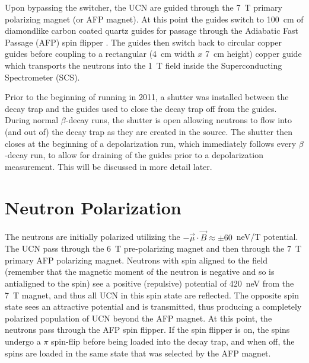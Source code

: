 Upon bypassing the switcher,
the UCN are guided through the 7~T primary polarizing magnet (or AFP magnet). At this point
the guides switch to 100~cm of diamondlike carbon coated quartz guides \cite{mammei2010thin}
for passage through the Adiabatic Fast Passage (AFP) spin flipper \cite{holley2012high}.
The guides then switch back to circular copper guides before coupling to a rectangular
(4~cm width $x$ 7~cm height) copper guide which transports the neutrons into the 1~T field
inside the Superconducting Spectrometer (SCS).

Prior to the beginning of running in 2011, a shutter was installed between the decay trap and
the guides used to close the decay trap off from the guides. During normal $\beta$-decay
runs, the shutter is open allowing neutrons to flow into (and out of) the decay trap as they are
created in the source. The shutter then closes at the beginning of a depolarization run, which immediately
follows every $\beta$-decay run, to allow for draining of the guides prior to a depolarization
measurement. This will be discussed in more detail later.

\section{Neutron Polarization} \label{sec:polarization}

The neutrons are initially polarized utilizing the $-\vec{\mu}\cdot \vec{B} \approx \pm 60$~neV/T
potential. The UCN pass through the 6~T pre-polarizing magnet and then
through the 7~T primary AFP polarizing magnet. Neutrons with spin
aligned to the field (remember that the magnetic moment of the neutron is negative and so is antialigned
to the spin) see a positive (repulsive) potential of 420~neV from the 7~T magnet, and thus all
UCN in this spin state are reflected. The opposite spin state sees an attractive potential
and is transmitted, thus producing
a completely polarized population of UCN beyond the AFP magnet.
At this point, the neutrons pass through the AFP spin flipper. If the spin flipper is on, the spins
undergo a $\pi$ spin-flip before being loaded into the decay trap, and when off, the spins are
loaded in the same state that was selected by the AFP magnet.

